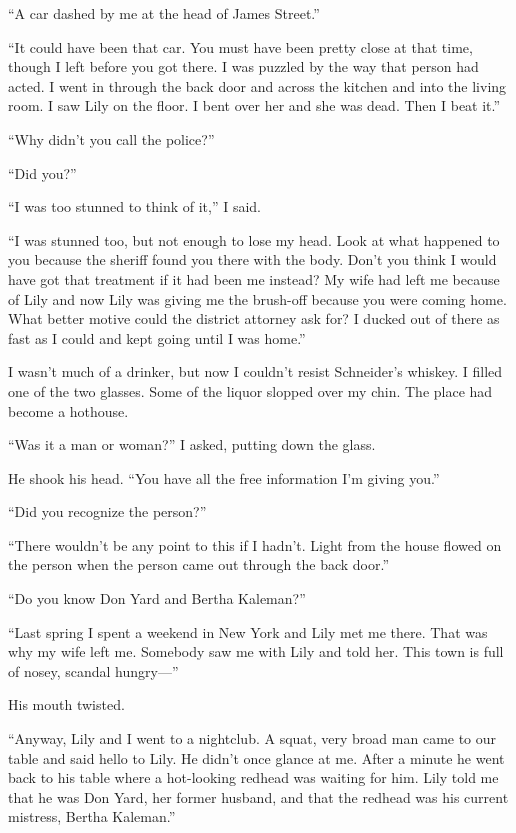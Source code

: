 \documentclass{novel}
\begin{document}
“A car dashed by me at the head of James Street.”

“It could have been that car. You must have been pretty close at that time, though I left before you got there. I was puzzled by the way that person had acted. I went in through the back door and across the kitchen and into the living room. I saw Lily on the floor. I bent over her and she was dead. Then I beat it.”

“Why didn’t you call the police?”

“Did you?”

“I was too stunned to think of it,” I said.

“I was stunned too, but not enough to lose my head. Look at what happened to you because the sheriff found you there with the body. Don’t you think I would have got that treatment if it had been me instead? My wife had left me because of Lily and now Lily was giving me the brush-off because you were coming home. What better motive could the district attorney ask for? I ducked out of there as fast as I could and kept going until I was home.”

\scenestars

I wasn’t much of a drinker, but now I couldn’t resist Schneider’s whiskey. I filled one of the two glasses. Some of the liquor slopped over my chin. The place had become a hothouse.

“Was it a man or woman?” I asked, putting down the glass.

He shook his head. “You have all the free information I’m giving you.”

“Did you recognize the person?”

“There wouldn’t be any point to this if I hadn’t. Light from the house flowed on the person when the person came out through the back door.”

“Do you know Don Yard and Bertha Kaleman?”

“Last spring I spent a weekend in New York and Lily met me there. That was why my wife left me. Somebody saw me with Lily and told her. This town is full of nosey, scandal hungry—” 

His mouth twisted. 

“Anyway, Lily and I went to a nightclub. A squat, very broad man came to our table and said hello to Lily. He didn’t once glance at me. After a minute he went back to his table where a hot-looking redhead was waiting for him. Lily told me that he was Don Yard, her former husband, and that the redhead was his current mistress, Bertha Kaleman.”
\end{document}
